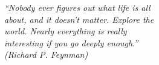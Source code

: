 
\begin{epigrafe}
    \vspace*{\fill}
	\begin{flushright}
		\textit{“Nobody ever figures out what life is all\\
			about, and it doesn’t matter. Explore the\\
			world. Nearly everything is really\\
			interesting if you go deeply enough.”\\		
		(Richard P. Feynman)}
	\end{flushright}
\end{epigrafe}
